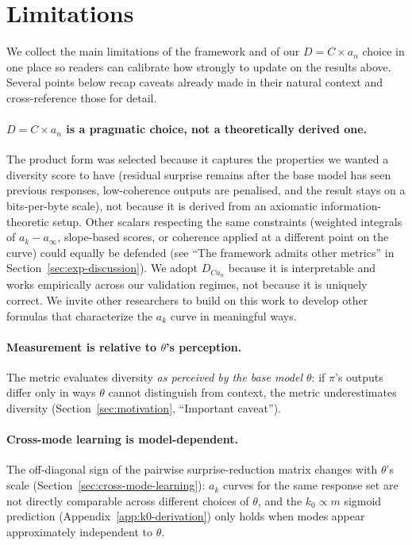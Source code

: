 \section{Limitations}\label{sec:limitations}

We collect the main limitations of the framework and of our $D = C \times a_n$ choice in one place so readers can calibrate how strongly to update on the results above.
Several points below recap caveats already made in their natural context and cross-reference those for detail.

\paragraph{$D = C \times a_n$ is a pragmatic choice, not a theoretically derived one.}
The product form was selected because it captures the properties we wanted a diversity score to have (residual surprise remains after the base model has seen previous responses, low-coherence outputs are penalised, and the result stays on a bits-per-byte scale), not because it is derived from an axiomatic information-theoretic setup.
Other scalars respecting the same constraints (weighted integrals of $a_k - a_\infty$, slope-based scores, or coherence applied at a different point on the curve) could equally be defended (see ``The framework admits other metrics'' in Section~\ref{sec:exp-discussion}).
We adopt $D_{Ca_n}$ because it is interpretable and works empirically across our validation regimes, not because it is uniquely correct.
We invite other researchers to build on this work to develop other formulas that characterize the $a_k$ curve in meaningful ways.

\paragraph{Measurement is relative to $\theta$'s perception.}
The metric evaluates diversity \emph{as perceived by the base model $\theta$}: if $\pi$'s outputs differ only in ways $\theta$ cannot distinguish from context, the metric underestimates diversity (Section~\ref{sec:motivation}, ``Important caveat'').

\paragraph{Cross-mode learning is model-dependent.}
The off-diagonal sign of the pairwise surprise-reduction matrix changes with $\theta$'s scale (Section~\ref{sec:cross-mode-learning}): $a_k$ curves for the same response set are not directly comparable across different choices of $\theta$, and the $k_0 \propto m$ sigmoid prediction (Appendix~\ref{app:k0-derivation}) only holds when modes appear approximately independent to $\theta$.

